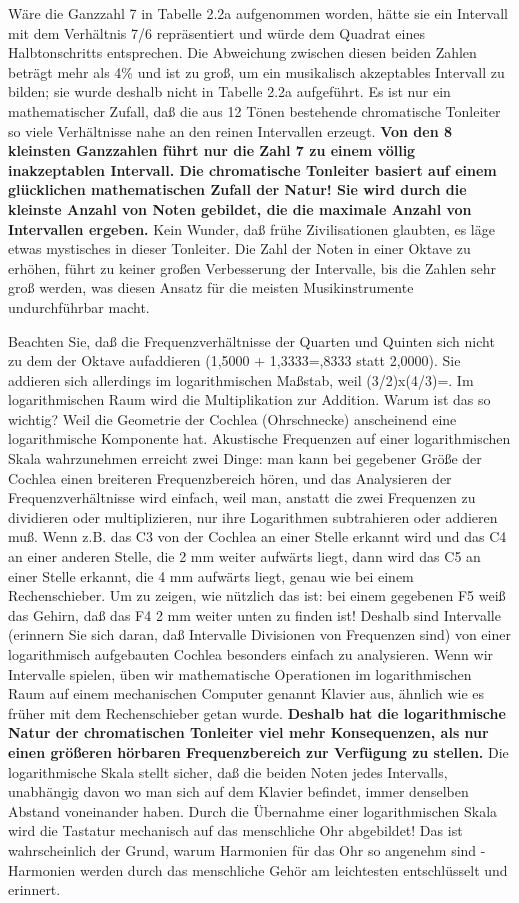 Wäre die Ganzzahl 7 in Tabelle 2.2a aufgenommen worden, hätte sie ein Intervall mit dem Verhältnis 7/6 repräsentiert und würde dem Quadrat eines Halbtonschritts entsprechen.
 Die Abweichung zwischen diesen beiden Zahlen beträgt mehr als 4\% und ist zu groß, um ein musikalisch akzeptables Intervall zu bilden; sie wurde deshalb nicht in Tabelle 2.2a aufgeführt.
 Es ist nur ein mathematischer Zufall, daß die aus 12 Tönen bestehende chromatische Tonleiter so viele Verhältnisse nahe an den reinen Intervallen erzeugt.
 \textbf{Von den 8 kleinsten Ganzzahlen führt nur die Zahl 7 zu einem völlig inakzeptablen Intervall.
 Die chromatische Tonleiter basiert auf einem glücklichen mathematischen Zufall der Natur!
 Sie wird durch die kleinste Anzahl von Noten gebildet, die die maximale Anzahl von Intervallen ergeben.}
 Kein Wunder, daß frühe Zivilisationen glaubten, es läge etwas mystisches in dieser Tonleiter.
 Die Zahl der Noten in einer Oktave zu erhöhen, führt zu keiner großen Verbesserung der Intervalle, bis die Zahlen sehr groß werden, was diesen Ansatz für die meisten Musikinstrumente undurchführbar macht.
 

Beachten Sie, daß die Frequenzverhältnisse der Quarten und Quinten sich nicht zu dem der Oktave aufaddieren (1,5000 + 1,3333\nolinebreak=,8333 statt 2,0000).
 Sie addieren sich allerdings im logarithmischen Maßstab, weil (3/2)x(4/3)\nolinebreak=.
 Im logarithmischen Raum wird die Multiplikation zur Addition.
 Warum ist das so wichtig?
 Weil die Geometrie der Cochlea (Ohrschnecke) anscheinend eine logarithmische Komponente hat.
 Akustische Frequenzen auf einer logarithmischen Skala wahrzunehmen erreicht zwei Dinge: man kann bei gegebener Größe der Cochlea einen breiteren Frequenzbereich hören, und das Analysieren der Frequenzverhältnisse wird einfach, weil man, anstatt die zwei Frequenzen zu dividieren oder multiplizieren, nur ihre Logarithmen subtrahieren oder addieren muß.
 Wenn z.B. das C3 von der Cochlea an einer Stelle erkannt wird und das C4 an einer anderen Stelle, die 2 mm weiter aufwärts liegt, dann wird das C5 an einer Stelle erkannt, die 4 mm aufwärts liegt, genau wie bei einem Rechenschieber.
 Um zu zeigen, wie nützlich das ist: bei einem gegebenen F5 weiß das Gehirn, daß das F4 2 mm weiter unten zu finden ist!
 Deshalb sind Intervalle (erinnern Sie sich daran, daß Intervalle Divisionen von Frequenzen sind) von einer logarithmisch aufgebauten Cochlea besonders einfach zu analysieren.
 Wenn wir Intervalle spielen, üben wir mathematische Operationen im logarithmischen Raum auf einem mechanischen Computer genannt Klavier aus, ähnlich wie es früher mit dem Rechenschieber getan wurde.
 \textbf{Deshalb hat die logarithmische Natur der chromatischen Tonleiter viel mehr Konsequenzen, als nur einen größeren hörbaren Frequenzbereich zur Verfügung zu stellen.}
 Die logarithmische Skala stellt sicher, daß die beiden Noten jedes Intervalls, unabhängig davon wo man sich auf dem Klavier befindet, immer denselben Abstand voneinander haben.
 Durch die Übernahme einer logarithmischen Skala wird die Tastatur mechanisch auf das menschliche Ohr abgebildet!
 Das ist wahrscheinlich der Grund, warum Harmonien für das Ohr so angenehm sind - Harmonien werden durch das menschliche Gehör am leichtesten entschlüsselt und erinnert.
 

